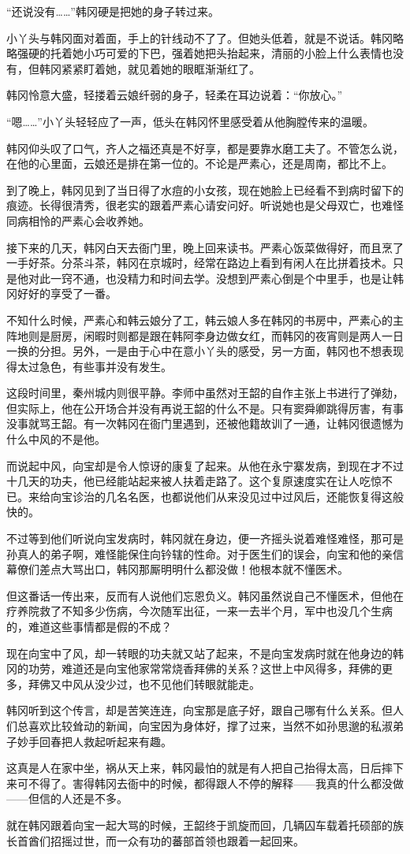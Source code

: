 “还说没有……”韩冈硬是把她的身子转过来。

小丫头与韩冈面对着面，手上的针线动不了了。但她头低着，就是不说话。韩冈略略强硬的托着她小巧可爱的下巴，强着她把头抬起来，清丽的小脸上什么表情也没有，但韩冈紧紧盯着她，就见着她的眼眶渐渐红了。

韩冈怜意大盛，轻搂着云娘纤弱的身子，轻柔在耳边说着：“你放心。”

“嗯……”小丫头轻轻应了一声，低头在韩冈怀里感受着从他胸膛传来的温暖。

韩冈仰头叹了口气，齐人之福还真是不好享，都是要靠水磨工夫了。不管怎么说，在他的心里面，云娘还是排在第一位的。不论是严素心，还是周南，都比不上。

到了晚上，韩冈见到了当日得了水痘的小女孩，现在她脸上已经看不到病时留下的痕迹。长得很清秀，很老实的跟着严素心请安问好。听说她也是父母双亡，也难怪同病相怜的严素心会收养她。

接下来的几天，韩冈白天去衙门里，晚上回来读书。严素心饭菜做得好，而且烹了一手好茶。分茶斗茶，韩冈在京城时，经常在路边上看到有闲人在比拼着技术。只是他对此一窍不通，也没精力和时间去学。没想到严素心倒是个中里手，也是让韩冈好好的享受了一番。

不知什么时候，严素心和韩云娘分了工，韩云娘人多在韩冈的书房中，严素心的主阵地则是厨房，闲暇时则都是跟在韩阿李身边做女红，而韩冈的夜宵则是两人一日一换的分担。另外，一是由于心中在意小丫头的感受，另一方面，韩冈也不想表现得太过急色，有些事并没有发生。

这段时间里，秦州城内则很平静。李师中虽然对王韶的自作主张上书进行了弹劾，但实际上，他在公开场合并没有再说王韶的什么不是。只有窦舜卿跳得厉害，有事没事就骂王韶。有一次韩冈在衙门里遇到，还被他籍故训了一通，让韩冈很遗憾为什么中风的不是他。

而说起中风，向宝却是令人惊讶的康复了起来。从他在永宁寨发病，到现在才不过十几天的功夫，他已经能站起来被人扶着走路了。这个复原速度实在让人吃惊不已。来给向宝诊治的几名名医，也都说他们从来没见过中过风后，还能恢复得这般快的。

不过等到他们听说向宝发病时，韩冈就在身边，便一齐摇头说着难怪难怪，那可是孙真人的弟子啊，难怪能保住向钤辖的性命。对于医生们的误会，向宝和他的亲信幕僚们差点大骂出口，韩冈那厮明明什么都没做！他根本就不懂医术。

但这番话一传出来，反而有人说他们忘恩负义。韩冈虽然说自己不懂医术，但他在疗养院救了不知多少伤病，今次随军出征，一来一去半个月，军中也没几个生病的，难道这些事情都是假的不成？

现在向宝中了风，却一转眼的功夫就又站了起来，不是向宝发病时就在他身边的韩冈的功劳，难道还是向宝他家常常烧香拜佛的关系？这世上中风得多，拜佛的更多，拜佛又中风从没少过，也不见他们转眼就能走。

韩冈听到这个传言，却是苦笑连连，向宝那是底子好，跟自己哪有什么关系。但人们总喜欢比较耸动的新闻，向宝因为身体好，撑了过来，当然不如孙思邈的私淑弟子妙手回春把人救起听起来有趣。

这真是人在家中坐，祸从天上来，韩冈最怕的就是有人把自己抬得太高，日后摔下来可不得了。害得韩冈去衙中的时候，都得跟人不停的解释——我真的什么都没做——但信的人还是不多。

就在韩冈跟着向宝一起大骂的时候，王韶终于凯旋而回，几辆囚车载着托硕部的族长首酋们招摇过世，而一众有功的蕃部首领也跟着一起回来。

